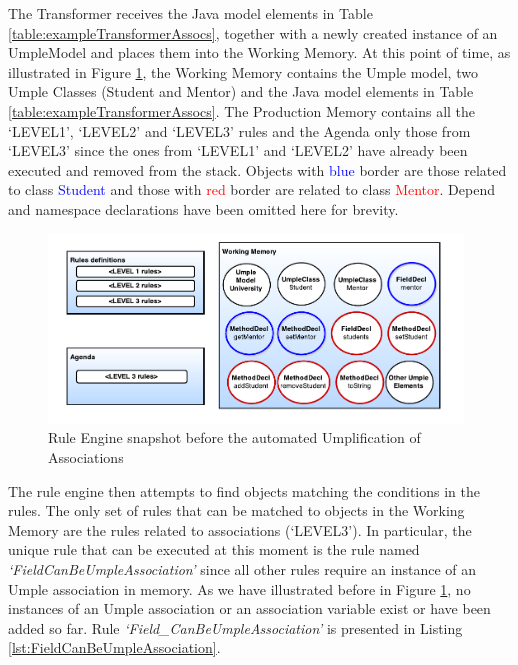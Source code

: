 The Transformer receives the Java model elements in Table \ref{table:exampleTransformerAssocs}, together with a newly created instance of an UmpleModel and places them into the Working Memory. 
At this point of time, as illustrated in Figure \ref{fig:ruleModelAssoc1}, the Working Memory contains the Umple model, two Umple Classes (Student and Mentor) and the Java model elements in Table \ref{table:exampleTransformerAssocs}. The Production Memory contains all the `LEVEL1', `LEVEL2' and `LEVEL3' rules and the Agenda only those from `LEVEL3' since the ones from `LEVEL1' and  `LEVEL2' have already been executed and removed from the stack. Objects with \textcolor{blue}{blue} border are those related to class \textcolor{blue}{Student} and those with \textcolor{red}{red} border are related to class \textcolor{red}{Mentor}. Depend and namespace declarations have been omitted here for brevity.

\begin{figure}[h]
\centering
\includegraphics[width=0.98\textwidth]{Figures/ruleModelAssoc1.pdf}
\caption{Rule Engine snapshot before the automated Umplification of Associations}
\label{fig:ruleModelAssoc1}
\end{figure}

The rule engine then attempts to find objects matching the conditions in the rules. The only set of rules that can be matched to objects in the Working Memory are the rules related to associations (`LEVEL3'). In particular, the unique rule that can be executed at this moment is the rule named \textit{`FieldCanBeUmpleAssociation'} since all other rules require an instance of an Umple association in memory. As we have illustrated before in Figure \ref{fig:ruleModelAssoc1}, no instances of an Umple association or an association variable exist or have been added so far. Rule \textit{`Field\_CanBeUmpleAssociation'} is presented in Listing \ref{lst:FieldCanBeUmpleAssociation}. 

